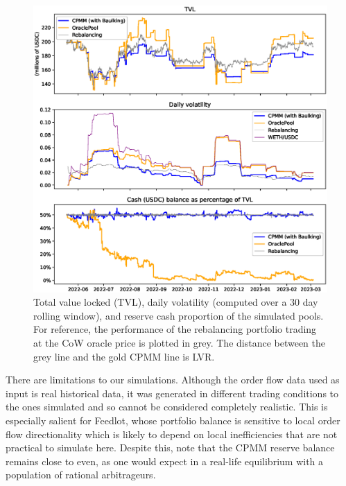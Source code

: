 \documentclass[a4paper,10pt]{article}
\theoremstyle{remark}
\begin{document}
\begin{figure}
  \label{pool-metrics}
  \begin{center}
    \includegraphics[width=\textwidth * \real{0.7}]{diagrams/pool_metrics.eps}
    \caption{Total value locked (TVL), daily volatility (computed over a 30 day rolling window), and reserve cash proportion of the simulated pools.
    For reference, the performance of the rebalancing portfolio trading at the CoW oracle price is plotted in grey. The distance between the grey line and the gold CPMM line is LVR.}
  \end{center}
\end{figure}


There are limitations to our simulations. 
%
Although the order flow data used as input is real historical data, it was generated in different trading conditions to the ones simulated and so cannot be considered completely realistic.
%
This is especially salient for Feedlot, whose portfolio balance is sensitive to local order flow directionality which is likely to depend on local inefficiencies that are not practical to simulate here.
%
Despite this, note that the CPMM reserve balance remains close to even, as one would expect in a real-life equilibrium with a population of rational arbitrageurs.

%
\end{document}
